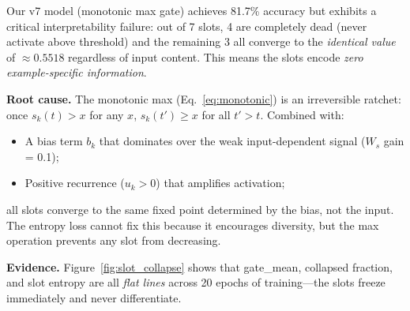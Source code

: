 \documentclass[conference]{IEEEtran}
\begin{document}
Our v7 model (monotonic max gate) achieves 81.7\% accuracy but
exhibits a critical interpretability failure: out of 7 slots,
4 are completely dead (never activate above threshold) and the
remaining 3 all converge to the \emph{identical value} of
$\approx 0.5518$ regardless of input content.  This means the
slots encode \emph{zero example-specific information}.

\textbf{Root cause.}
The monotonic max (Eq.~\ref{eq:monotonic}) is an irreversible
ratchet: once $s_k(t) > x$ for any $x$, $s_k(t') \geq x$ for all
$t' > t$.  Combined with:
\begin{itemize}[nosep]
    \item A bias term $b_k$ that dominates over the weak
          input-dependent signal ($W_s$ gain = 0.1);
    \item Positive recurrence ($u_k > 0$) that amplifies
          activation;
\end{itemize}
all slots converge to the same fixed point determined by the bias,
not the input.  The entropy loss cannot fix this because it
encourages diversity, but the max operation prevents any slot from
decreasing.

\textbf{Evidence.}
Figure~\ref{fig:slot_collapse} shows that gate\_mean, collapsed
fraction, and slot entropy are all \emph{flat lines} across 20
epochs of training---the slots freeze immediately and never
differentiate.
\end{document}
